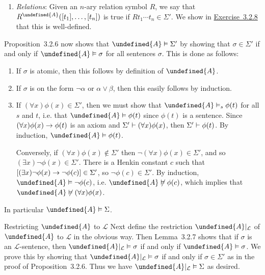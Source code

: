 \documentclass[article, a4paper, 11pt, oneside]{memoir}
\let\mathfrak\undefined
\numberwithin{equation}{chapter}
\newcommand{\calL}{\mathcal{L}}
\newcommand{\frakA}{\mathfrak{A}}
\newcommand{\RNum}[1]{\uppercase\expandafter{\romannumeral #1\relax}}
\newcommand{\exref}[1]{%
    \hyperref[ex:#1]{Exercise~#1}%
}
\theoremstyle{nonumberplain}
\begin{document}
\begin{notelist}
\begin{enumerate}
        \item \emph{Relations}: Given an $n$-ary relation symbol $R$, we say that $R^\frakA([t_1], \ldots, [t_n])$ is true if $R t_1 \cdots t_n \in \Sigma'$. We show in \exref{3.2.8} that this is well-defined.
    \end{enumerate}
    Proposition~3.2.6 now shows that $\frakA \models \Sigma'$ by showing that $\sigma \in \Sigma'$ if and only if $\frakA \models \sigma$ for all sentences $\sigma$. This is done as follows:
    \begin{enumerate}
        \item If $\sigma$ is atomic, then this follows by definition of $\frakA$.
        
        \item If $\sigma$ is on the form $\neg\alpha$ or $\alpha \lor \beta$, then this easily follows by induction.
        
        \item If $(\forall x)\phi(x) \in \Sigma'$, then we must show that $\frakA \sats{s} \phi(t)$ for all $s$ and $t$, i.e. that $\frakA \models \phi(t)$ since $\phi(t)$ is a sentence. Since $(\forall x)\phi(x) \rightarrow \phi(t)$ is an axiom and $\Sigma' \vdash (\forall x)\phi(x)$, then $\Sigma' \vdash \phi(t)$. By induction, $\frakA \models \phi(t)$.

        Conversely, if $(\forall x)\phi(x) \not\in \Sigma'$ then $\neg(\forall x)\phi(x) \in \Sigma'$, and so $(\exists x)\neg\phi(x) \in \Sigma'$. There is a Henkin constant $c$ such that $[(\exists x)\neg\phi(x) \rightarrow \neg\phi(c)] \in \Sigma'$, so $\neg\phi(c) \in \Sigma'$. By induction, $\frakA \models \neg\phi(c)$, i.e. $\frakA \not\models \phi(c)$, which implies that $\frakA \not\models (\forall x)\phi(x)$.
    \end{enumerate}
    In particular $\frakA \models \Sigma$.

    \item[Restricting $\frakA$ to $\calL$]
    Next define the restriction $\frakA|_\calL$ of $\frakA$ to $\calL$ in the obvious way. Then Lemma~3.2.7 shows that if $\sigma$ is an $\calL$-sentence, then $\frakA|_\calL \models \sigma$ if and only if $\frakA \models \sigma$. We prove this by showing that $\frakA|_\calL \models \sigma$ if and only if $\sigma \in \Sigma'$ as in the proof of Proposition~3.2.6. Thus we have $\frakA|_\calL \models \Sigma$ as desired.
\end{notelist}
\end{document}
